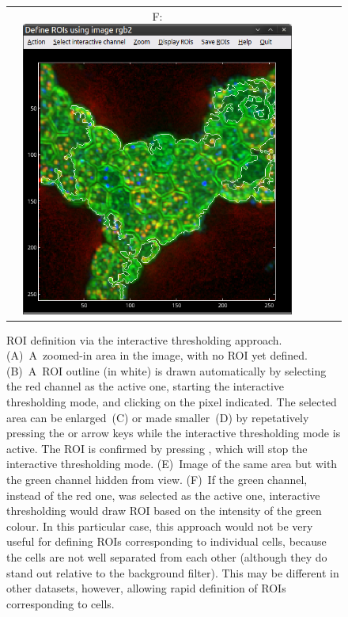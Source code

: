\begin{figure}[!ht]
\begin{tabular}{cccccc}
&
F: \includegraphics[scale=0.23]{figs3/LANS-roi-interactive5}
\end{tabular}
\caption{\label{fig:roi-interactive5}%
ROI definition via the interactive thresholding approach. (A)~A~zoomed-in area in the image, with no ROI yet defined. (B)~A~ROI outline (in white) is drawn automatically by selecting the red channel as the active one, starting the interactive thresholding mode, and clicking on the pixel indicated. The selected area can be enlarged~(C) or made smaller~(D) by repetatively pressing the  or  arrow keys while the interactive thresholding mode is active. The ROI is confirmed by pressing , which will stop the interactive thresholding mode. (E)~Image of the same area but with the green channel hidden from view. (F)~If the green channel, instead of the red one, was selected as the active one, interactive thresholding would draw ROI based on the intensity of the green colour. In this particular case, this approach would not be very useful for defining ROIs corresponding to individual cells, because the cells are not well separated from each other (although they do stand out relative to the background filter). This may be different in other datasets, however, allowing rapid definition of ROIs corresponding to cells.}
\end{figure}

